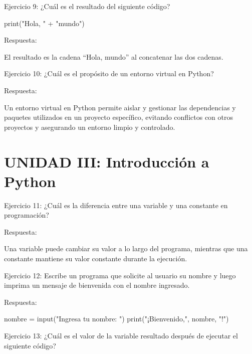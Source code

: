 \documentclass[
  a4paper,
  DIV=11,
  numbers=noendperiod,
  onepage,
  openany]{scrreprt}
\newenvironment{Shaded}{\begin{snugshade}}{\end{snugshade}}
\newcommand{\BuiltInTok}[1]{\textcolor[rgb]{0.00,0.23,0.31}{#1}}
\newcommand{\NormalTok}[1]{\textcolor[rgb]{0.00,0.23,0.31}{#1}}
\newcommand{\OperatorTok}[1]{\textcolor[rgb]{0.37,0.37,0.37}{#1}}
\newcommand{\StringTok}[1]{\textcolor[rgb]{0.13,0.47,0.30}{#1}}
\begin{document}
Ejercicio 9: ¿Cuál es el resultado del siguiente código?

\begin{Shaded}
\begin{Highlighting}[]
\BuiltInTok{print}\NormalTok{(}\StringTok{"Hola, "} \OperatorTok{+} \StringTok{"mundo"}\NormalTok{)}
\end{Highlighting}
\end{Shaded}

Respuesta:

El resultado es la cadena ``Hola, mundo'' al concatenar las dos cadenas.

Ejercicio 10: ¿Cuál es el propósito de un entorno virtual en Python?

Respuesta:

Un entorno virtual en Python permite aislar y gestionar las dependencias
y paquetes utilizados en un proyecto específico, evitando conflictos con
otros proyectos y asegurando un entorno limpio y controlado.

\hypertarget{unidad-iii-introducciuxf3n-a-python}{%
\section{UNIDAD III: Introducción a
Python}\label{unidad-iii-introducciuxf3n-a-python}}

Ejercicio 11: ¿Cuál es la diferencia entre una variable y una constante
en programación?

Respuesta:

Una variable puede cambiar su valor a lo largo del programa, mientras
que una constante mantiene su valor constante durante la ejecución.

Ejercicio 12: Escribe un programa que solicite al usuario su nombre y
luego imprima un mensaje de bienvenida con el nombre ingresado.

Respuesta:

\begin{Shaded}
\begin{Highlighting}[]
\NormalTok{nombre }\OperatorTok{=} \BuiltInTok{input}\NormalTok{(}\StringTok{"Ingresa tu nombre: "}\NormalTok{)}
\BuiltInTok{print}\NormalTok{(}\StringTok{"¡Bienvenido,"}\NormalTok{, nombre, }\StringTok{"!"}\NormalTok{)}
\end{Highlighting}
\end{Shaded}

Ejercicio 13: ¿Cuál es el valor de la variable resultado después de
ejecutar el siguiente código?
\end{document}
